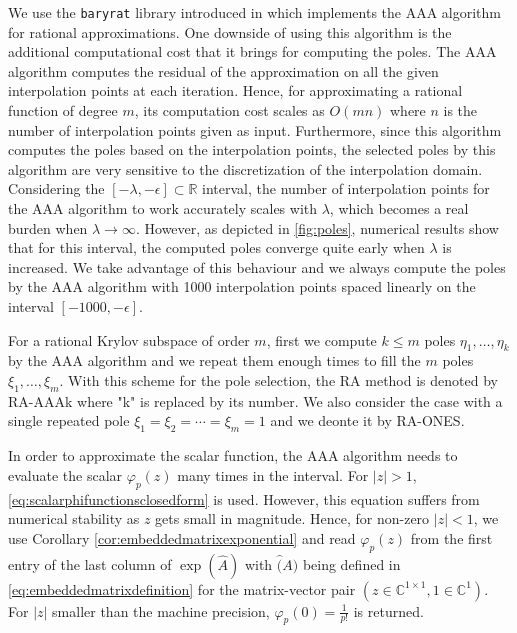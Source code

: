 We use the \texttt{baryrat} library introduced in \cite{hofreither2021BRASIL} which implements
the AAA algorithm for rational approximations. One downside of using this algorithm
is the additional computational cost that it brings for computing the poles.
The AAA algorithm  computes the residual of the approximation on all the given interpolation points at
each iteration. Hence, for approximating a rational function of degree $m$, its computation cost scales
as $O(mn)$ where $n$ is the number of interpolation points given as input.
Furthermore, since this algorithm computes the poles based on the interpolation points, the
selected poles by this algorithm are very sensitive to the discretization of the interpolation domain.
Considering the $[-\lambda, -\epsilon] \subset \mathbb{R}$ interval, the number of interpolation
points for the AAA algorithm to work accurately scales with $\lambda$, which becomes a real burden
when $\lambda \to \infty$. However, as depicted in \autoref{fig:poles}, numerical results show that
for this interval, the computed poles converge quite early when $\lambda$ is increased. We take
advantage of this behaviour and we always compute the poles by the AAA algorithm with 1000 interpolation
points spaced linearly on the interval $[-1000, -\epsilon]$.

For a rational Krylov subspace of order $m$, first we compute $k \le m$ poles $\eta_1, \dots, \eta_k$
by the AAA algorithm and we repeat them enough times to fill the $m$ poles $\xi_1, \dots, \xi_m$.
With this scheme for the pole selection, the RA method is denoted by RA-AAAk where "k" is replaced
by its number.
We also consider the case with a single repeated pole $\xi_1 = \xi_2 = \cdots = \xi_{m} = 1$ and
we deonte it by RA-ONES.

\begin{remark}
    In order to approximate the scalar function, the AAA algorithm needs to evaluate the scalar
    $\varphi_p(z)$ many times in the interval. For $|z| > 1$, \eqref{eq:scalarphifunctionsclosedform}
    is used.
    However, this equation suffers from numerical stability as $z$ gets small in magnitude. Hence, for
    non-zero $|z| < 1$, we use Corollary \ref{cor:embeddedmatrixexponential} and read $\varphi_p(z)$
    from the first entry of the last column of $\exp(\hat{A})$ with $\hat(A)$ being defined in
    \eqref{eq:embeddedmatrixdefinition} for the matrix-vector pair
    $(z \in \mathbb{C}^{1 \times 1}, 1 \in \mathbb{C}^{1})$. For $|z|$ smaller than the machine precision,
    $\varphi_p(0) = \frac{1}{p!}$ is returned.
\end{remark}

